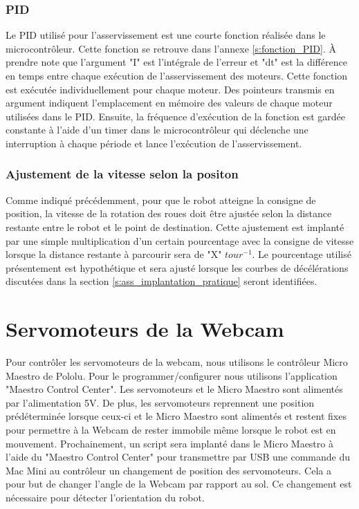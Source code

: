 \subsubsection{PID}
Le PID utilisé pour l'asservissement est une courte fonction réalisée dans le microcontrôleur. Cette fonction se retrouve dans l'annexe \ref{s:fonction_PID}. À prendre note que l'argument "I" est l'intégrale de l'erreur et "dt" est la différence en temps entre chaque exécution de l'asservissement des moteurs. Cette fonction est exécutée individuellement pour chaque moteur. Des pointeurs transmis en argument indiquent l'emplacement en mémoire des valeurs de chaque moteur utilisées dans le PID. Ensuite, la fréquence d'exécution de la fonction est gardée constante à l'aide d'un timer dans le microcontrôleur qui déclenche une interruption à chaque période et lance l'exécution de l'asservissement.
\subsubsection{Ajustement de la vitesse selon la positon}
Comme indiqué précédemment, pour que le robot atteigne la consigne de position, la vitesse de la rotation des roues doit être ajustée selon la distance restante entre le robot et le point de destination. Cette ajustement est implanté par une simple multiplication d'un certain pourcentage avec la consigne de vitesse lorsque la distance restante à parcourir sera de "X" $tour^{-1}$. Le pourcentage utilisé présentement est hypothétique et sera ajusté lorsque les courbes de décélérations discutées dans la section \ref{s:ass_implantation_pratique} seront identifiées.

\section{Servomoteurs de la Webcam}
Pour contrôler les servomoteurs de la webcam, nous utilisons le contrôleur Micro Maestro de Pololu. Pour le programmer/configurer nous utilisons l'application "Maestro Control Center". Les servomoteurs et le Micro Maestro sont alimentés par l'alimentation 5V. De plus, les servomoteurs reprennent une position prédéterminée lorsque ceux-ci et le Micro Maestro sont alimentés et restent fixes pour permettre à la Webcam de rester immobile même lorsque le robot est en mouvement. Prochainement, un script sera implanté dans le Micro Maestro à l'aide du "Maestro Control Center" pour transmettre par USB une commande du Mac Mini au contrôleur un changement de position des servomoteurs. Cela a pour but de changer l'angle de la Webcam par rapport au sol. Ce changement est nécessaire pour détecter l'orientation du robot.

